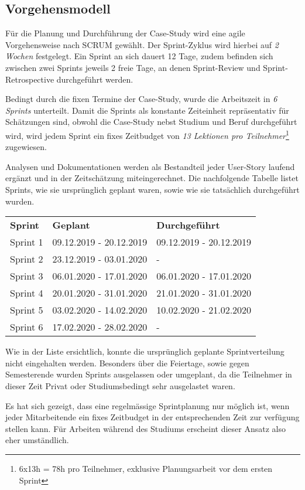 \subsection{Vorgehensmodell}
Für die Planung und Durchführung der Case-Study wird eine agile Vorgehensweise nach SCRUM gewählt. Der Sprint-Zyklus wird hierbei auf \emph{2 Wochen} festgelegt. Ein Sprint an sich dauert 12 Tage, zudem befinden sich zwischen zwei Sprints jeweils 2 freie Tage, an denen Sprint-Review und Sprint-Retrospective durchgeführt werden.

Bedingt durch die fixen Termine der Case-Study, wurde die Arbeitszeit in \emph{6 Sprints} unterteilt. Damit die Sprints als konstante Zeiteinheit repräsentativ für Schätzungen sind, obwohl die Case-Study nebst Studium und Beruf durchgeführt wird, wird jedem Sprint ein fixes Zeitbudget von \emph{13 Lektionen pro Teilnehmer}\footnote{6x13h = 78h pro Teilnehmer, exklusive Planungsarbeit vor dem ersten Sprint} zugewiesen.

Analysen und Dokumentationen werden als Bestandteil jeder User-Story laufend ergänzt und in der Zeitschätzung miteingerechnet. Die nachfolgende Tabelle listet Sprints, wie sie ursprünglich geplant waren, sowie wie sie tatsächlich durchgeführt wurden.

\begin{center}
  \begin{tabular}{ p{3cm} p{4.5cm} p{4.5cm} }
    \textbf{Sprint} & \textbf{Geplant} & \textbf{Durchgeführt} \\
    Sprint 1 & 09.12.2019 - 20.12.2019 & 09.12.2019 - 20.12.2019 \\
    Sprint 2 & 23.12.2019 - 03.01.2020 & - \\
    Sprint 3 & 06.01.2020 - 17.01.2020 & 06.01.2020 - 17.01.2020 \\
    Sprint 4 & 20.01.2020 - 31.01.2020 & 21.01.2020 - 31.01.2020 \\
    Sprint 5 & 03.02.2020 - 14.02.2020 & 10.02.2020 - 21.02.2020 \\
    Sprint 6 & 17.02.2020 - 28.02.2020 & - \\
  \end{tabular}
\end{center}

\noindent
Wie in der Liste ersichtlich, konnte die ursprünglich geplante Sprintverteilung nicht eingehalten werden. Besonders über die Feiertage, sowie gegen Semesterende wurden Sprints ausgelassen oder umgeplant, da die Teilnehmer in dieser Zeit Privat oder Studiumsbedingt sehr ausgelastet waren.

Es hat sich gezeigt, dass eine regelmässige Sprintplanung nur möglich ist, wenn jeder Mitarbeitende ein fixes Zeitbudget in der entsprechenden Zeit zur verfügung stellen kann. Für Arbeiten während des Studiums erscheint dieser Ansatz also eher umständlich.
